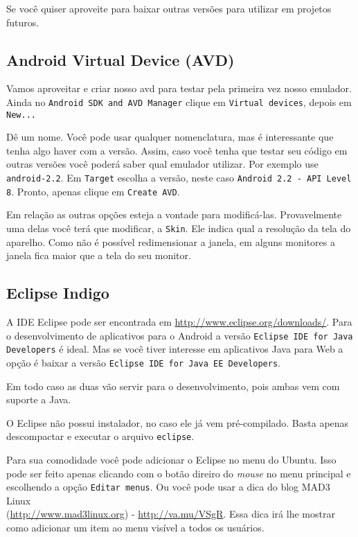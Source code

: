 Se você quiser aproveite para baixar outras versões para utilizar em projetos futuros.

\subsection{Android Virtual Device (AVD)}

Vamos aproveitar e criar nosso \gls{avd} para testar pela primeira vez nosso emulador. Ainda no
\texttt{Android SDK and AVD Manager} clique em \texttt{Virtual devices}, depois em \texttt{New...}

Dê um nome. Você pode usar qualquer nomenclatura, mas é interessante que tenha algo haver com a versão. Assim,
caso você tenha que testar seu código em outras versões você poderá saber qual emulador utilizar. Por
exemplo use \texttt{android-2.2}. Em \texttt{Target} escolha a versão, neste caso
\texttt{Android 2.2 - API Level 8}. Pronto, apenas clique em \texttt{Create AVD}.

Em relação as outras opções esteja a vontade para modificá-las. Provavelmente uma delas você terá que
modificar, a \texttt{Skin}. Ele indica qual a resolução da tela do aparelho. Como não é possível
redimensionar a janela, em alguns monitores a janela fica maior que a tela do seu monitor.

\subsection{Eclipse Indigo}

A IDE Eclipse pode ser encontrada em \url{http://www.eclipse.org/downloads/}. Para o desenvolvimento
de aplicativos para o Android a versão \texttt{Eclipse IDE for Java Developers} é ideal. Mas se você
tiver interesse em aplicativos Java para Web a opção é baixar a versão \texttt{Eclipse IDE for Java EE Developers}.

Em todo caso as duas vão servir para o desenvolvimento, pois ambas vem com suporte a Java.

O Eclipse não possui instalador, no caso ele já vem pré-compilado. Basta apenas descompactar e executar
o arquivo \texttt{eclipse}.

Para sua comodidade você pode adicionar o Eclipse no menu do Ubuntu. Isso pode ser feito apenas clicando
com o botão direiro do \textit{mouse} no menu principal e escolhendo a opção \texttt{Editar menus}. Ou você pode
usar a dica do blog MAD3 Linux \\ (\url{http://www.mad3linux.org}) - \url{http://va.mu/VSgR}. Essa dica irá
lhe mostrar como adicionar um item ao menu visível a todos os usuários.

